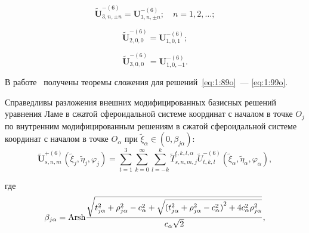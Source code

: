 \begin{equation}\label{eq:1:97o}
\mathbf{\tilde U}_{3,n,\pm n}^{-(6)}=\mathbf{U}_{3,n,\pm n}^{-(6)};\quad n=1,2,\dots;
\end{equation}

\begin{equation}\label{eq:1:98o}
\mathbf{\tilde U}_{2,0,0}^{-(6)}=\mathbf{U}_{1,0,1}^{-(6)};
\end{equation}

\begin{equation}\label{eq:1:99o}
\mathbf{\tilde U}_{3,0,0}^{-(6)}=\mathbf{U}_{1,0,-1}^{-(6)}.
\end{equation}

В работе~\cite{Nikolaev2014-1} получены теоремы сложения для решений~\eqref{eq:1:89o}~--- \eqref{eq:1:99o}.

\begin{theorem}
Справедливы разложения внешних модифицированных базисных решений уравнения Ламе в сжатой сфероидальной системе координат с началом в точке $O_j$ по внутренним модифицированным решениям в сжатой сфероидальной системе координат с началом в точке $O_\alpha$ при $\tilde\xi_\alpha\in(0,\beta_{j\alpha})$:
\begin{equation}
\mathbf{\tilde U}_{s,n,m}^{+(6)}(\tilde\xi_j,\tilde\eta_j,\varphi_j)=\sum\limits_{t=1}^3\sum\limits_{k=0}^\infty\sum\limits_{l=-k}^k\tilde T_{s,n,m,j}^{t,k,l,\alpha}\tilde U_{t,k,l}^{-(6)}(\tilde\xi_\alpha,\tilde\eta_\alpha,\varphi_\alpha),
\label{eq:1:100o}
\end{equation}

\noindent где
\begin{equation*}
\beta_{j\alpha}={\rm{Arsh}}\frac{{\sqrt {t_{j\alpha }^2 + \rho _{j\alpha }^2 - c_\alpha ^2 + \sqrt {{{(t_{j\alpha }^2 + \rho _{j\alpha }^2 - c_\alpha ^2)}^2} + 4c_\alpha ^2\rho _{j\alpha }^2} } }}{{{c_\alpha }\sqrt 2 }},
\end{equation*}


\end{theorem}
